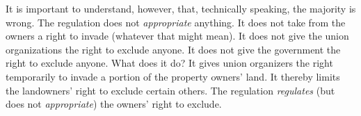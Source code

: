 %
%
%
%
%
%

It is important to understand, however, that, technically speaking, the majority
is wrong. The regulation does not \textit{appropriate} anything. It does not
take from the owners a right to invade (whatever that might mean). It does not
give the union organizations the right to exclude anyone. It does not give the
government the right to exclude anyone. What does it do? It gives union
organizers the right temporarily to invade a portion of the property owners'
land. It thereby limits the landowners' right to exclude certain others. The
regulation \textit{regulates} (but does not \textit{appropriate}) the owners'
right to exclude.


